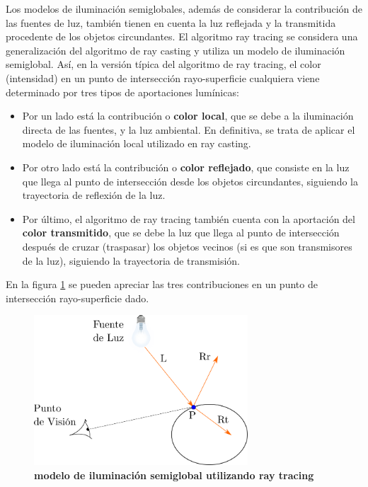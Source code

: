 Los modelos de iluminación semiglobales, además de considerar la contribución de las fuentes de luz, también tienen en cuenta la luz reflejada y la transmitida procedente de los objetos circundantes. El algoritmo ray tracing se considera una generalización del algoritmo de ray casting y utiliza un modelo de iluminación semiglobal.
Así, en la versión típica del algoritmo de ray tracing, el color (intensidad) en un punto de intersección rayo-superficie cualquiera viene determinado por tres tipos de aportaciones lumínicas:
\begin{itemize}
    \item Por un lado está la contribución o \textbf{color local}, que se debe a la iluminación directa de las fuentes, y la luz ambiental. En definitiva, se trata de aplicar el modelo de iluminación local utilizado en ray casting.
    \item Por otro lado está la contribución o \textbf{color reflejado}, que consiste en la luz que llega al punto de intersección desde los objetos circundantes, siguiendo la trayectoria de reflexión de la luz.
    \item Por último, el algoritmo de ray tracing también cuenta con la aportación del \textbf{color transmitido}, que se debe la luz que llega al punto de intersección después de cruzar (traspasar) los objetos vecinos (si es que son transmisores de la luz), siguiendo la trayectoria de transmisión. 

\end{itemize}

En la figura \ref{fig:grafica9} se pueden apreciar las tres contribuciones en un punto de intersección rayo-superficie dado.

\begin{figure}[h]
    \includegraphics[width=8cm]{Img/CPD/grafica9.png}
    \centering
    \caption{\textbf{\footnotesize{ modelo de iluminación semiglobal utilizando ray tracing  }}}
    \label{fig:grafica9}
\end{figure}

